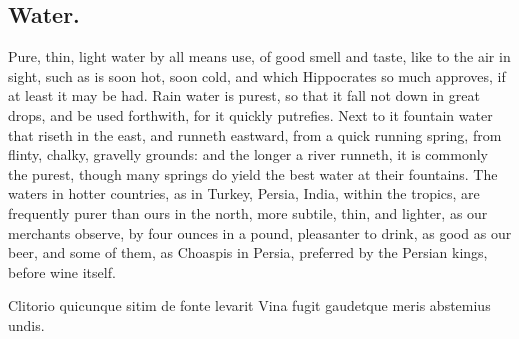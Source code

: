 {\subsection{Water.}
Pure, thin, light water by all means use, of good smell and
taste, like to the air in sight, such as is soon hot, soon cold, and
which Hippocrates so much approves, if at least it may be had. Rain
water is purest, so that it fall not down in great drops, and be used
forthwith, for it quickly putrefies. Next to it fountain water that
riseth in the east, and runneth eastward, from a quick running spring,
from flinty, chalky, gravelly grounds: and the longer a river runneth,
it is commonly the purest, though many springs do yield the best water
at their fountains. The waters in hotter countries, as in Turkey,
Persia, India, within the tropics, are frequently purer than ours in
the north, more subtile, thin, and lighter, as our merchants observe,
by four ounces in a pound, pleasanter to drink, as good as our beer,
and some of them, as Choaspis in Persia, preferred by the Persian
kings, before wine itself.

Clitorio quicunque sitim de fonte levarit
Vina fugit gaudetque meris abstemius undis.

}
